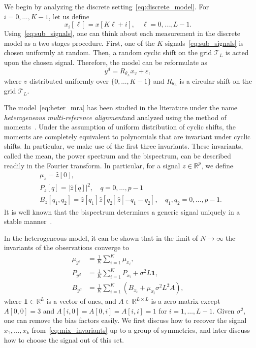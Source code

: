 \documentclass[english,12pt]{article}
\newcommand{\R}{\mathbb{R}}
\newcommand{\T}{\mathcal{T}}
\newcommand{\TODO}[1]{{\color{red}{[#1]}}}
\numberwithin{equation}{section}
\numberwithin{thm}{section} %
\begin{document}
We begin by analyzing the discrete setting~\eqref{eq:discrete_model}. 
For $i = 0,\ldots,K-1$, let us define 
\begin{equation} \label{eq:sub_signals}
x_i[\ell] = x[K\ell + i], \quad \ell=0,\ldots,L-1.
\end{equation}
Using~\eqref{eq:sub_signals}, one can think about each measurement in the discrete model 
as a two stages procedure. First, one of the $K$ signals~\eqref{eq:sub_signals} is chosen uniformly at random. Then, a random cyclic shift on the grid $\T_L$ is acted upon the chosen signal.
Therefore, the model can be reformulate  as 
\begin{equation} \label{eq:heter_mra}
y^d =  R_{\theta_{L}} x_{v} + \varepsilon,
\end{equation}
where $v$ distributed uniformly over $\{0,\ldots,K-1\}$ and $R_{\theta_L}$ is a circular shift on the grid $\T_L$. 

The model~\eqref{eq:heter_mra} has been studied in the literature under the name \emph{heterogeneous multi-reference alignment}and analyzed using the method of moments~\cite{perry2017sample,bandeira2017estimation,boumal2018heterogeneous}. Under the assumption of uniform distribution of cyclic shifts, the moments are completely equivalent to polynomials that are invariant under cyclic shifts. In particular, we make use of the first three invariants.  These invariants, called the mean, the power spectrum and the bispectrum, can be described readily in the Fourier transform. In particular, for a signal $z\in\R^p$, we define
\begin{align}
&\mu_z = \hat{z}[0], \nonumber \\
&P_z[q] = \vert \hat{z}[q]\vert^2, \quad q=0,\ldots,p-1\\
&B_z[q_1,q_2] = \hat{z}[q_1]\hat{z}[q_2]\hat{z}[-q_1-q_2], \quad q_1,q_2=0,\ldots,p-1. \nonumber
\end{align}  
It is well known that the bispectrum determines a generic signal uniquely in a stable manner~\cite{bendory2017bispectrum}. \TODO{Ref}

In the heterogeneous model, it can be shown that in the limit of $N\to\infty$ the invariants of the observations converge to \TODO{should be written more accurately} 
\begin{align} \label{eq:mix_invariants}
\mu_{y^d} &= \frac{1}{K}\sum_{i=1}^K \mu_{x_i}, \nonumber\\
P_{y^d} &= \frac{1}{K}\sum_{i=1}^K P_{x_i} + \sigma^2L\mathbf{1}, \\
B_{y^d} &= \frac{1}{K}\sum_{i=1}^K (B_{x_i} +\mu_{x_i}\sigma^2L^2 A ), \nonumber
\end{align}
where $\mathbf{1}\in\mathbb{R}^L$ is a vector of ones, and $A\in\mathbb{R}^{L\times L}$ is a zero matrix except $A[0,0]=3$ and $A[i,0]=A[0,i]=A[i,i]=1$ for $i=1,\ldots,L-1$.
Given $\sigma^2$, one can remove the bias factors easily. 
We first discuss how to recover the signal $x_1,\ldots,x_k$ from~\eqref{eq:mix_invariants} up to a group of symmetries, and later discuss how to  choose the signal out of this set. 
\end{document}
